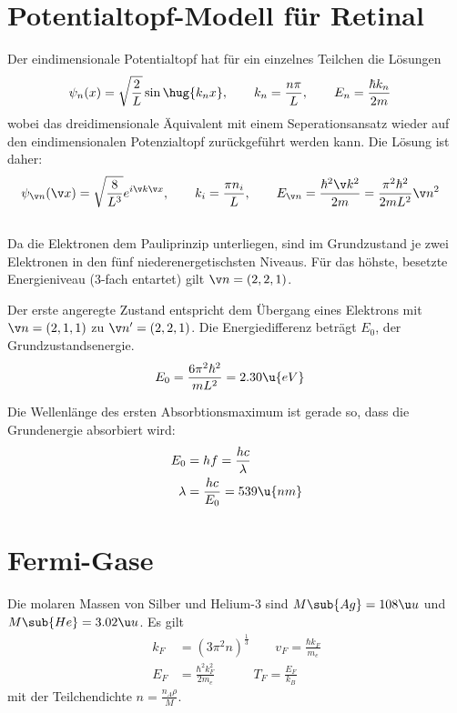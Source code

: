 \documentclass[exa]{exercise_5.0}
\begin{document}
\section{Potentialtopf-Modell für Retinal}
Der eindimensionale Potentialtopf hat für ein einzelnes Teilchen die Lösungen
\begin{align*}
    \psi_n(x) &= \sqrt{\frac 2L} \sin\hug{k_n x},\qquad k_n = \frac{n\pi}{L},\qquad 
    E_n = \frac{\hbar k_n}{2m} 
\end{align*}
wobei das dreidimensionale Äquivalent mit einem Seperationsansatz wieder auf den eindimensionalen Potenzialtopf zurückgeführt werden kann. Die Lösung ist daher:
\begin{align*}
    \psi_{\v n}(\v x) &= \sqrt{\frac 8{L^3}} e^{i \v k \v x },
    \qquad k_i=\frac{\pi n_i}{L},
    \qquad E_{\v n} = \frac{\hbar^2 \v k^2}{2m} = \frac{\pi^2\hbar^2}{2mL^2}\v n^2
\end{align*}
\subsection{}
Da die Elektronen dem Pauliprinzip unterliegen, sind im Grundzustand je zwei Elektronen in den fünf niederenergetischsten Niveaus. Für das höhste, besetzte Energieniveau (3-fach entartet) gilt $\v n =(2,2,1)$. 

Der erste angeregte Zustand entspricht dem Übergang eines Elektrons mit $\v n =(2,1,1)$ zu $\v n'=(2,2,1)$. Die Energiedifferenz beträgt $E_0$, der Grundzustandsenergie.
\begin{align*}
    E_0 &= \frac{6\pi^2\hbar^2}{mL^2} =  2.30\u{eV}
\end{align*}

Die Wellenlänge des ersten Absorbtionsmaximum ist gerade so, dass die Grundenergie absorbiert wird: 
\begin{align*}
    E_0& = hf = \frac{hc}{\lambda}\\
    \lambda &= \frac{hc}{E_0} = 539\u{nm}
\end{align*}

\section{Fermi-Gase}
Die molaren Massen von Silber und Helium-3 sind $M\sub{Ag} = 108\u u $ und $M\sub{He} = 3.02\u u $.
Es gilt
\begin{align*}
    k_F &= (3\pi^2 n)^{\frac13} \qquad  v_F = \frac{\hbar k_F}{m_e}\\
    E_F &= \frac{\hbar^2 k_F^2}{2m_e} \quad\qquad T_F = \frac{E_F}{k_B}
\end{align*}
mit der Teilchendichte $n = \frac{n_A \rho}M$. 
\end{document}
